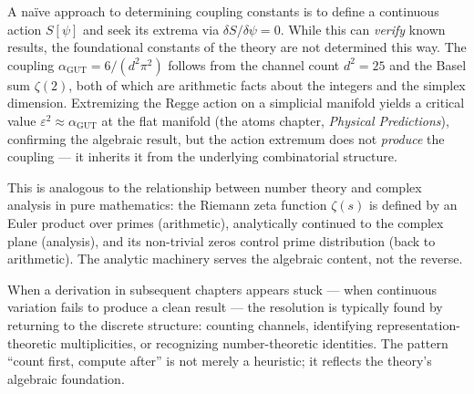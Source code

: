 \begin{remark}
A na\"ive approach to determining coupling constants is to define a continuous action $S[\psi]$ and seek its extrema via $\delta S/\delta\psi = 0$. While this can \emph{verify} known results, the foundational constants of the theory are not determined this way. The coupling $\alpha_{\mathrm{GUT}} = 6/(d^2\pi^2)$ follows from the channel count $d^2 = 25$ and the Basel sum $\zeta(2)$, both of which are arithmetic facts about the integers and the simplex dimension. Extremizing the Regge action on a simplicial manifold yields a critical value $\varepsilon^2 \approx \alpha_{\mathrm{GUT}}$ at the flat manifold (the atoms chapter, \textit{Physical Predictions}), confirming the algebraic result, but the action extremum does not \emph{produce} the coupling --- it inherits it from the underlying combinatorial structure.

This is analogous to the relationship between number theory and complex analysis in pure mathematics: the Riemann zeta function $\zeta(s)$ is defined by an Euler product over primes (arithmetic), analytically continued to the complex plane (analysis), and its non-trivial zeros control prime distribution (back to arithmetic). The analytic machinery serves the algebraic content, not the reverse.
\end{remark}

\begin{remark}
When a derivation in subsequent chapters appears stuck --- when continuous variation fails to produce a clean result --- the resolution is typically found by returning to the discrete structure: counting channels, identifying representation-theoretic multiplicities, or recognizing number-theoretic identities. The pattern ``count first, compute after'' is not merely a heuristic; it reflects the theory's algebraic foundation.
\end{remark}
